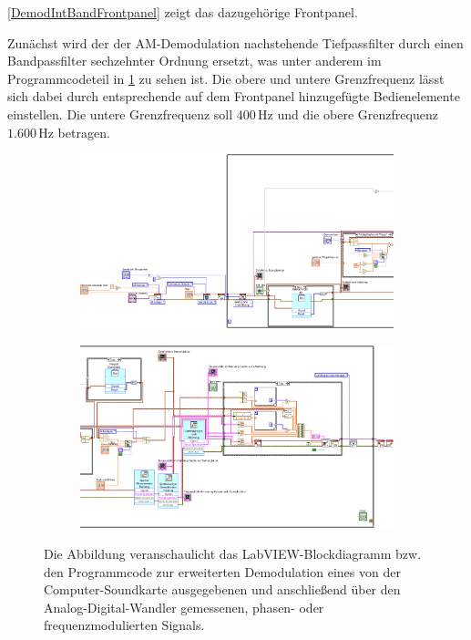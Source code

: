 \documentclass[
a4paper,
12pt,
pagesize,
ngerman
]{scrartcl}
\begin{document}
	\noindent \cref{DemodIntBandFrontpanel} zeigt das dazugehörige Frontpanel.
	
	Zunächst wird der der AM-Demodulation nachstehende Tiefpassfilter durch einen Bandpassfilter sechzehnter Ordnung ersetzt, was unter anderem im Programmcodeteil in \cref{DemodIntBandProgrammcode1} zu sehen ist.
	Die obere und untere Grenzfrequenz lässt sich dabei durch entsprechende auf dem Frontpanel hinzugefügte Bedienelemente einstellen.
	Die untere Grenzfrequenz soll $400\,$Hz und die obere Grenzfrequenz $1.600\,$Hz betragen.
	
	\begin{figure}[H]
		\centering
		\begin{subfigure}[t]{1.0\textwidth}
			\centering
			\includegraphics[width=1.0\textwidth]{EIRE2018Dateien/Tag4/OsziFMPM-Demod/mitBandpassUndIntegrationBilder/OsziPlusFMPMdTeil1}
		\end{subfigure}
		
		\vspace{0,2cm}
		
		\begin{subfigure}[t]{0.95\textwidth}
			\centering
			\includegraphics[width=1.0\textwidth]{EIRE2018Dateien/Tag4/OsziFMPM-Demod/mitBandpassUndIntegrationBilder/OsziPlusFMPMdTeil2}
		\end{subfigure}
		\caption{Die Abbildung veranschaulicht das LabVIEW-Blockdiagramm bzw. den Programmcode zur erweiterten Demodulation eines von der Computer-Soundkarte ausgegebenen und anschließend über den Analog-Digital-Wandler gemessenen, phasen- oder frequenzmodulierten Signals.}
		\label{DemodIntBandProgrammcode1}
	\end{figure}
	
\end{document}
